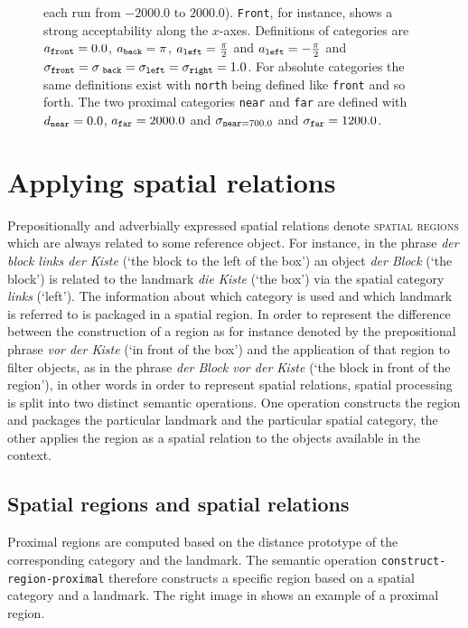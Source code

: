 \begin{figure}
{ each run from $-2000.0$ to $2000.0$). 
 {\footnotesize\tt Front}, for instance, shows a strong acceptability along the $x$-axes. Definitions of 
categories are $a_{\mathtt{\footnotesize front}}=0.0$, $a_{\mathtt{\footnotesize back}}=\pi$, 
$a_{\mathtt{\footnotesize left}}=\frac{\pi}{2}$ and $a_\mathtt{{\footnotesize left}}=-\frac{\pi}{2}$ and
$\sigma_{\mathtt{\footnotesize front}}=\sigma_{\mathtt{\footnotesize\ back}}=\sigma_\mathtt{{\footnotesize left}}=\sigma_{\mathtt{\footnotesize right}} = 1.0$.
For absolute categories the same definitions exist with {\footnotesize\tt north} being defined like {\footnotesize\tt front}
and so forth.
The two proximal categories {\footnotesize\tt near} and {\footnotesize\tt far} are defined 
with $d_{\mathtt{\footnotesize near}}=0.0$, $a_{\mathtt{\footnotesize far}}=2000.0$ and 
$\sigma_{\mathtt{\footnotesize near}=700.0}$ and $\sigma_{\mathtt{\footnotesize far}}=1200.0$.}
\end{figure}


\section{Applying spatial relations}
Prepositionally and adverbially expressed spatial relations denote 
\textsc{spatial regions} which are always related to some reference object.
For instance, in the phrase \textit{der block links der Kiste} (`the block to the left
of the box') an object \textit{der Block} (`the block') is related to the landmark 
\textit{die Kiste} (`the box') via the spatial category \textit{links} (`left'). 
The information about which category is used and which landmark
is referred to is packaged in a spatial region.
In order to represent the difference between the construction of a region
as for instance denoted by the prepositional phrase \textit{vor der Kiste}
(`in front of the box') and the application of that region to filter objects,
as in the phrase \textit{der Block vor der Kiste} (`the block in front of the region'),
in other words in order to represent spatial relations, spatial 
processing is split into two distinct semantic operations. One operation
constructs the region and packages the particular landmark and the particular
spatial category, the other applies the region as a spatial relation 
to the objects available in the context.

\subsection{Spatial regions and spatial relations}
Proximal regions are computed based on the distance prototype of the 
corresponding category and the landmark. The semantic operation
{\footnotesize\tt construct-region-proximal} therefore constructs a specific 
region based on a spatial category and a landmark. 
The right image in  
shows an example of a proximal region. 

